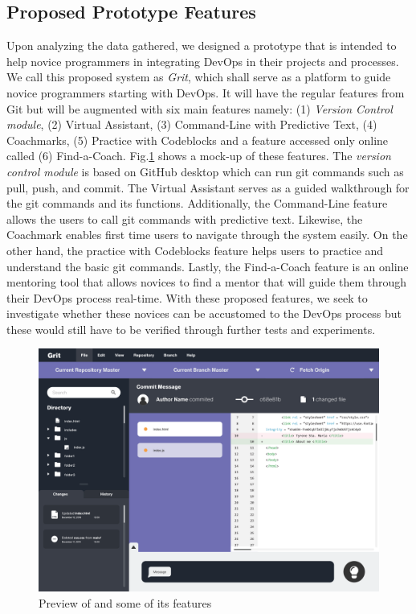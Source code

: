 \documentclass{sigchi}
\begin{document}
\subsection{Proposed Prototype Features}
Upon analyzing the data gathered, we designed a prototype that is intended to help novice programmers in integrating DevOps in their projects and processes. We call this proposed system as \textit{Grit}, which shall serve as a platform to guide novice programmers starting with DevOps. It will have the regular features from Git but will be augmented with six main features namely: (1) \textit{Version Control module}, (2) Virtual Assistant, (3) Command-Line with Predictive Text, (4) Coachmarks, (5) Practice with Codeblocks and a feature accessed only online called (6) Find-a-Coach. Fig.\ref{fig:mockup} shows a mock-up of these features. The \textit{version control module} is based on GitHub desktop which can run git commands such as pull, push, and commit. The Virtual Assistant serves as a guided walkthrough for the git commands and its functions. Additionally, the Command-Line feature allows the users to call git commands with predictive text. Likewise, the Coachmark enables first time users to navigate through the system easily. On the other hand, the practice with Codeblocks feature helps users to practice and understand the basic git commands. Lastly, the Find-a-Coach feature is an online mentoring tool that allows novices to find a mentor that will guide them through their DevOps process real-time. With these proposed features, we seek to investigate whether these novices can be accustomed to the DevOps process but these would still have to be verified through further tests and experiments. 
\begin{figure}[tp]
    \centering
    \includegraphics[width=0.75\columnwidth]{figures/mockup1}
    \caption{Preview of  and some of its features}
    \label{fig:mockup}
\end{figure}
\end{document}
